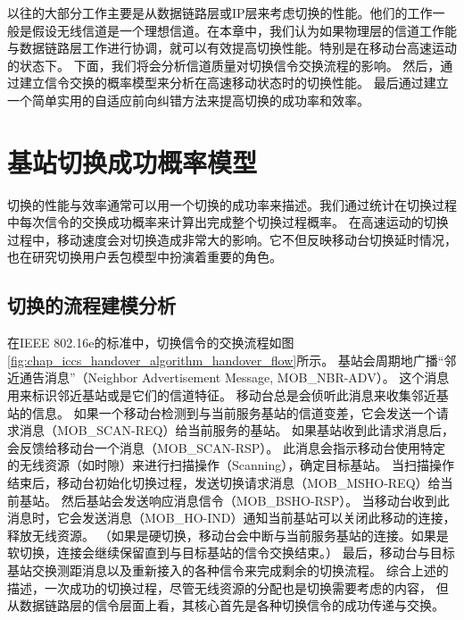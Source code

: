 以往的大部分工作主要是从数据链路层或IP层来考虑切换的性能。他们的工作一般是假设无线信道是一个理想信道。在本章中，我们认为如果物理层的信道工作能与数据链路层工作进行协调，就可以有效提高切换性能。特别是在移动台高速运动的状态下。
下面，我们将会分析信道质量对切换信令交换流程的影响。
然后，通过建立信令交换的概率模型来分析在高速移动状态时的切换性能。
最后通过建立一个简单实用的自适应前向纠错方法来提高切换的成功率和效率。


\section{基站切换成功概率模型}
\label{section_iccs_handover_algorithm_mobility_analysis}
切换的性能与效率通常可以用一个切换的成功率来描述。我们通过统计在切换过程中每次信令的交换成功概率来计算出完成整个切换过程概率。
在高速运动的切换过程中，移动速度会对切换造成非常大的影响。它不但反映移动台切换延时情况，也在研究切换用户丢包模型中扮演着重要的角色。
\subsection{切换的流程建模分析}
\label{subsection_iccs_handover_algorithm_mobility_analysis_handover_flow}
在IEEE 802.16e的标准中，切换信令的交换流程如图\ref{fig:chap_iccs_handover_algorithm_handover_flow}所示。
基站会周期地广播“邻近通告消息”（Neighbor Advertisement Message, MOB\_NBR-ADV）。
这个消息用来标识邻近基站或是它们的信道特征。
移动台总是会侦听此消息来收集邻近基站的信息。
如果一个移动台检测到与当前服务基站的信道变差，它会发送一个请求消息（MOB\_SCAN-REQ）给当前服务的基站。
如果基站收到此请求消息后，会反馈给移动台一个消息（MOB\_SCAN-RSP）。
此消息会指示移动台使用特定的无线资源（如时隙）来进行扫描操作（Scanning），确定目标基站。
当扫描操作结束后，移动台初始化切换过程，发送切换请求消息（MOB\_MSHO-REQ）给当前基站。
然后基站会发送响应消息信令（MOB\_BSHO-RSP）。
当移动台收到此消息时，它会发送消息（MOB\_HO-IND）通知当前基站可以关闭此移动的连接，释放无线资源。
（如果是硬切换，移动台会中断与当前服务基站的连接。如果是软切换，连接会继续保留直到与目标基站的信令交换结束。）
最后，移动台与目标基站交换测距消息以及重新接入的各种信令来完成剩余的切换流程。
综合上述的描述，一次成功的切换过程，尽管无线资源的分配也是切换需要考虑的内容，
但从数据链路层的信令层面上看，其核心首先是各种切换信令的成功传递与交换。


